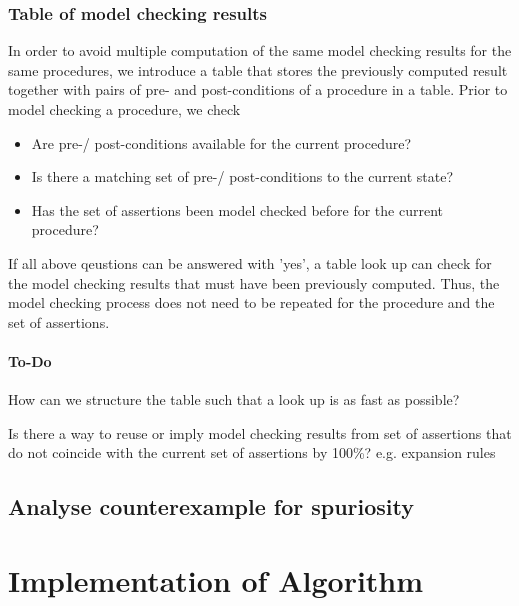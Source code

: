 \documentclass[a4paper,12pt]{article}
\begin{document}
\subsubsection{Table of model checking results}
In order to avoid multiple computation of the same model checking results for the same procedures, we introduce a table that stores the previously computed result together with pairs of pre- and post-conditions of a procedure in a table. Prior to model checking a procedure, we check
\begin{itemize}
	\item Are pre-/ post-conditions available for the current procedure?
	\item Is there a matching set of pre-/ post-conditions to the current state?
	\item Has the set of assertions been model checked before for the current procedure?
\end{itemize}
If all above qeustions can be answered with 'yes', a table look up can check for the model checking results that must have been previously computed. Thus, the model checking process does not need to be repeated for the procedure and the set of assertions.\\

\paragraph{To-Do} 
\begin{todolist}
	\item How can we structure the table such that a look up is as fast as possible?
	\item Is there a way to reuse or imply model checking results from set of assertions that do not coincide with the current set of assertions by 100\%? e.g. expansion rules 
\end{todolist}

\subsection{Analyse counterexample for spuriosity}

\section{Implementation of Algorithm}
\end{document}
